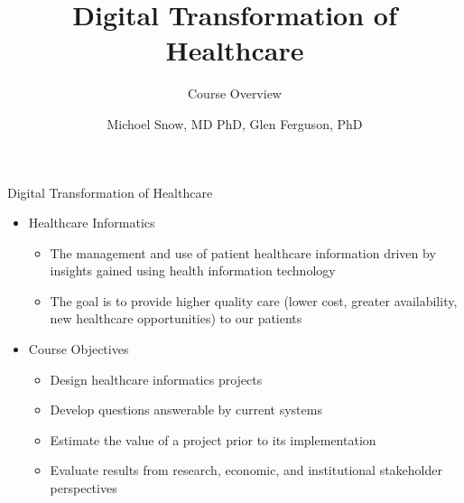 \documentclass[10pt]{beamer}
\title{Digital Transformation of Healthcare}
\subtitle{Course Overview}
\date{}
\author{Michoel Snow, MD PhD, Glen Ferguson, PhD}
\institute{Center for Health Data Innovations}
\begin{document}
\maketitle


\begin{frame}{Digital Transformation of Healthcare}
	\begin{itemize}
		\item Healthcare Informatics
		\begin{itemize}
			\item The management and use of patient healthcare information driven by insights gained using health information technology
			\item The goal is to provide higher quality care (lower cost, greater availability, new healthcare opportunities) to our patients
		\end{itemize}
		\item Course Objectives
		\begin{itemize}
			\item Design healthcare informatics projects
			\item Develop questions answerable by current systems
			\item Estimate the value of a project prior to its implementation
			\item Evaluate results from research, economic, and institutional stakeholder  perspectives
		\end{itemize}
	\end{itemize}
\end{frame}
\end{document}
